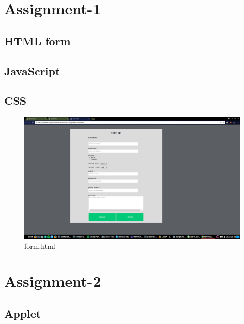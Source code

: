 \documentclass[a4paper,16pt]{article}
\begin{document}
	{
		\doublespacing
		{
			\renewcommand\contentsname{\Huge Contents}
			\renewcommand\cftsecfont{\LARGE}
			
			\renewcommand\cftsubsecfont{\Large}
			
			\doublespacing
			\tableofcontents
			\doublespacing
		}
	}
	\newpage
	\section{Assignment-1}
	\subsection{HTML form}
	\vspace{0.2in}
	
	\subsection{JavaScript}
	
	\subsection{CSS}
	
	\begin{figure}[h!]
		\includegraphics*[scale=0.25,width=1\linewidth]{code/form.png}
		\caption{\large form.html}
	\end{figure}
	\clearpage
	\section{Assignment-2}
	\subsection{Applet}
\end{document}
